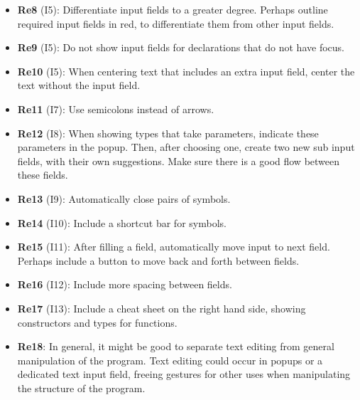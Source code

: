 \begin{itemize}
    \item \textbf{Re8} (I5): Differentiate input fields to a greater degree. Perhaps outline required input fields in red, to differentiate them from other input fields.
    \item \textbf{Re9} (I5): Do not show input fields for declarations that do not have focus.
    \item \textbf{Re10} (I5): When centering text that includes an extra input field, center the text without the input field. 
    \item \textbf{Re11} (I7): Use semicolons instead of arrows.
    \item \textbf{Re12} (I8): When showing types that take parameters, indicate these parameters in the popup. Then, after choosing one, create two new sub input fields, with their own suggestions. Make sure there is a good flow between these fields.
    \item \textbf{Re13} (I9): Automatically close pairs of symbols.
    \item \textbf{Re14} (I10): Include a shortcut bar for symbols.
    \item \textbf{Re15} (I11): After filling a field, automatically move input to next field. Perhaps include a button to move back and forth between fields.
    \item \textbf{Re16} (I12): Include more spacing between fields.
    \item \textbf{Re17} (I13): Include a cheat sheet on the right hand side, showing constructors and types for functions.
    \item \textbf{Re18}: In general, it might be good to separate text editing from general manipulation of the program. Text editing could occur in popups or a dedicated text input field, freeing gestures for other uses when manipulating the structure of the program.
\end{itemize}

